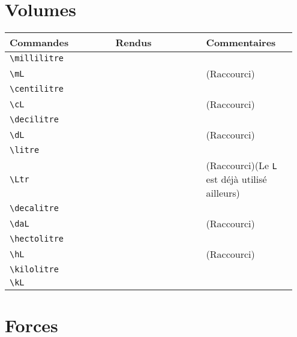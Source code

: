 \documentclass[a4paper,12pt]{article}
\newcommand{\rac}{({\color{red}Raccourci})}
\begin{document}
	\section{Volumes}
	\noindent
	\begin{tabular}{|p{0.35\linewidth}|p{0.3\linewidth}|p{0.3\linewidth}|}
		\hline
 			\textbf{Commandes}&\textbf{Rendus}&\textbf{Commentaires}
 		\\\hline\hline
 			\verb!\millilitre!	& 	\millilitre	&	\\
 		\hline
			\verb!\mL!		& 	\mL		&	\rac\\
		\hline
			\verb!\centilitre!	& 	\centilitre	&	\\
		\hline
			\verb!\cL!		& 	\cL		&	\rac\\
		\hline
			\verb!\decilitre!	& 	\decilitre	&	\\
		\hline
			\verb!\dL!		& 	\dL		&	\rac\\
		\hline
			\verb!\litre!		& 	\litre		&	\\
		\hline
			\verb!\Ltr!		& 	\Ltr		&	\rac (Le \verb!L! est déjà utilisé ailleurs)\\
		\hline
			\verb!\decalitre!	& 	\decalitre	&	\\
		\hline
			\verb!\daL!		& 	\daL		&	\rac\\
		\hline
			\verb!\hectolitre!	& 	\hectolitre	&	\\
		\hline
			\verb!\hL!		& 	\hL		&	\rac\\
		\hline
			\verb!\kilolitre!	& 	\kilolitre	&	\\
		\hline
			\verb!\kL!		& 	\kL		&	\\
		\hline
	\end{tabular}
	
	
	\section{Forces}
	
\end{document}

